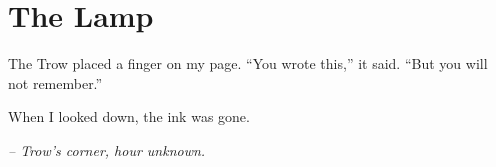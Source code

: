 \chapter*{The Lamp}

The Trow placed a finger on my page. ``You wrote this,'' it said. ``But you will not remember.''

When I looked down, the ink was gone.

\smallskip

\noindent \textit{-- Trow's corner, hour unknown.}

